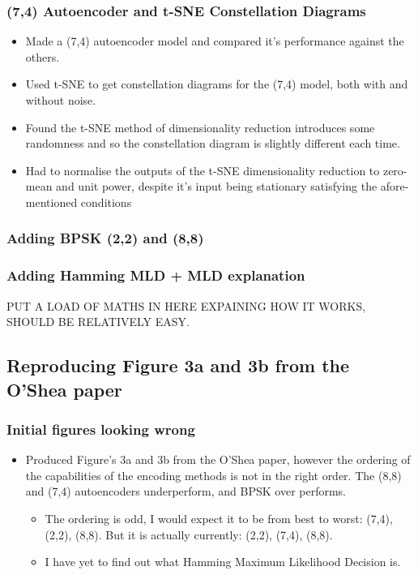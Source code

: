 \documentclass[12pt,onecolumn,letterpaper]{article}
\begin{document}
\subsubsection{(7,4) Autoencoder and t-SNE Constellation Diagrams}

\begin{itemize}
   \item Made a (7,4) autoencoder model and compared it's performance against the others.
   \item Used t-SNE to get constellation diagrams for the (7,4) model, both with and without noise.
   \item Found the t-SNE method of dimensionality reduction introduces some randomness and so the constellation diagram is slightly different each time.
   \item Had to normalise the outputs of the t-SNE dimensionality reduction to zero-mean and unit power, despite it's input being stationary satisfying the afore-mentioned conditions
\end{itemize}

\subsubsection{Adding BPSK (2,2) and (8,8)}

\subsubsection{Adding Hamming MLD + MLD explanation}

PUT A LOAD OF MATHS IN HERE EXPAINING HOW IT WORKS, SHOULD BE RELATIVELY EASY.

\subsection{Reproducing Figure 3a and 3b from the O'Shea paper}

\subsubsection{Initial figures looking wrong}

\begin{itemize}
   \item Produced Figure's 3a and 3b from the O'Shea paper, however the ordering of the capabilities of the encoding methods is not in the right order. The (8,8) and (7,4) autoencoders underperform, and BPSK over performs.
   \begin{itemize}
      \item The ordering is odd, I would expect it to be from best to worst: (7,4), (2,2), (8,8). But it is actually currently: (2,2), (7,4), (8,8).
      \item I have yet to find out what Hamming Maximum Likelihood Decision is.
   \end{itemize}
\end{itemize}
\end{document}
